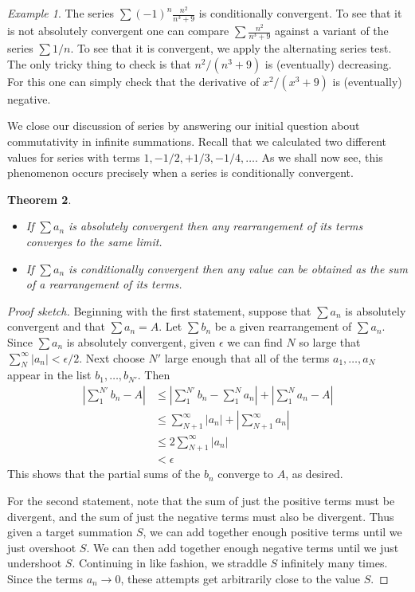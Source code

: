 \documentclass[11pt,oneside]{amsbook}
\theoremstyle{definition}
\theoremstyle{plain}
\newtheorem{theorem}{Theorem}[section]
\theoremstyle{definition}
\theoremstyle{remark}
\newtheorem{example}[theorem]{Example}
\numberwithin{equation}{section}
\numberwithin{figure}{section}
\begin{document}
\begin{example}
  The series $\sum(-1)^n\frac{n^2}{n^3+9}$ is conditionally convergent. To see that it is not absolutely convergent one can compare $\sum\frac{n^2}{n^3+9}$ against a variant of the series $\sum 1/n$. To see that it is convergent, we apply the alternating series test. The only tricky thing to check is that $n^2/(n^3+9)$ is (eventually) decreasing. For this one can simply check that the derivative of $x^2/(x^3+9)$ is (eventually) negative.
\end{example}

We close our discussion of series by answering our initial question about commutativity in infinite summations. Recall that we calculated two different values for series with terms $1,-1/2,+1/3,-1/4,\ldots$. As we shall now see, this phenomenon occurs precisely when a series is conditionally convergent.

\begin{theorem}
  \begin{itemize}
  \item If $\sum a_n$ is absolutely convergent then any rearrangement of its terms converges to the same limit.
  \item If $\sum a_n$ is conditionally convergent then any value can be obtained as the sum of a rearrangement of its terms.
  \end{itemize}
\end{theorem}

\begin{proof}[Proof sketch]
  Beginning with the first statement, suppose that $\sum a_n$ is absolutely convergent and that $\sum a_n=A$. Let $\sum b_n$ be a given rearrangement of $\sum a_n$. Since $\sum a_n$ is absolutely convergent, given $\epsilon$ we can find $N$ so large that $\sum_N^\infty|a_n|<\epsilon/2$. Next choose $N'$ large enough that all of the terms $a_1,\ldots,a_N$ appear in the list $b_1,\ldots,b_{N'}$. Then
  \begin{align*}
    \left|\sum_1^{N'}b_n-A\right|
    &\leq\left|\sum_1^{N'}b_n-\sum_1^Na_n\right|+\left|\sum_1^Na_n-A\right|\\
    &\leq\sum_{N+1}^\infty|a_n|+\left|\sum_{N+1}^\infty a_n\right|\\
    &\leq2\sum_{N+1}^\infty|a_n|\\
    &<\epsilon
  \end{align*}
  This shows that the partial sums of the $b_n$ converge to $A$, as desired.
  
  For the second statement, note that the sum of just the positive terms must be divergent, and the sum of just the negative terms must also be divergent. Thus given a target summation $S$, we can add together enough positive terms until we just overshoot $S$. We can then add together enough negative terms until we just undershoot $S$. Continuing in like fashion, we straddle $S$ infinitely many times. Since the terms $a_n\to0$, these attempts get arbitrarily close to the value $S$.
\end{proof}
\end{document}
